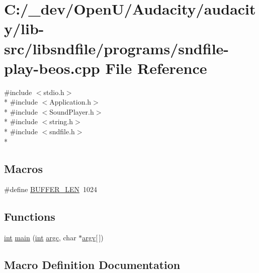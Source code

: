 \hypertarget{sndfile-play-beos_8cpp}{}\section{C\+:/\+\_\+dev/\+Open\+U/\+Audacity/audacity/lib-\/src/libsndfile/programs/sndfile-\/play-\/beos.cpp File Reference}
\label{sndfile-play-beos_8cpp}
{\ttfamily \#include $<$stdio.\+h$>$}\\*
{\ttfamily \#include $<$Application.\+h$>$}\\*
{\ttfamily \#include $<$Sound\+Player.\+h$>$}\\*
{\ttfamily \#include $<$string.\+h$>$}\\*
{\ttfamily \#include $<$sndfile.\+h$>$}\\*
\subsection*{Macros}
\begin{DoxyCompactItemize}
\item 
\#define \hyperlink{sndfile-play-beos_8cpp_a46130dc86f2322714bba26960b64e7bb}{B\+U\+F\+F\+E\+R\+\_\+\+L\+EN}~1024
\end{DoxyCompactItemize}
\subsection*{Functions}
\begin{DoxyCompactItemize}
\item 
\hyperlink{xmltok_8h_a5a0d4a5641ce434f1d23533f2b2e6653}{int} \hyperlink{sndfile-play-beos_8cpp_a0ddf1224851353fc92bfbff6f499fa97}{main} (\hyperlink{xmltok_8h_a5a0d4a5641ce434f1d23533f2b2e6653}{int} \hyperlink{cmdline_8c_aaffeb1bf2056ea44af5b5d0ee4d6ff07}{argc}, char $\ast$\hyperlink{cmdline_8c_ad407d5ba91709bd9b092003858600723}{argv}\mbox{[}$\,$\mbox{]})
\end{DoxyCompactItemize}


\subsection{Macro Definition Documentation}
